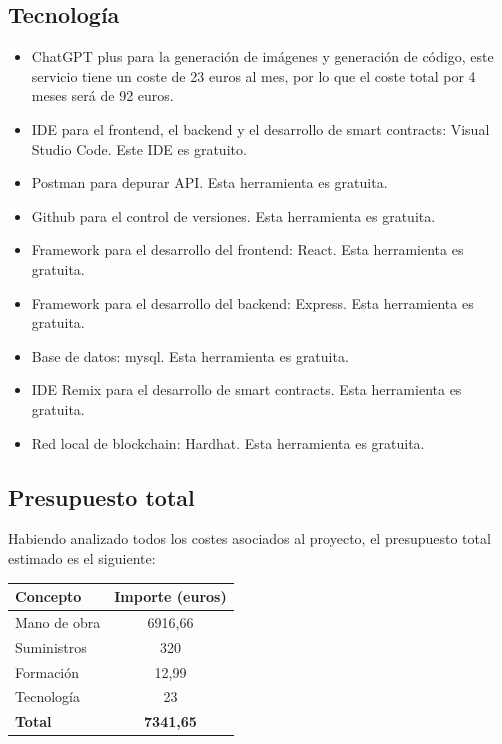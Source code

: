 \subsection{Tecnología}
\begin{itemize}
    \item ChatGPT plus para la generación de imágenes y generación de código, este servicio tiene un coste de 23 euros al mes, por lo que el coste total por 4 meses será de 92 euros.\\
    \item IDE para el frontend, el backend y el desarrollo de smart contracts: Visual Studio Code. Este IDE es gratuito.\\
    \item Postman para depurar API. Esta herramienta es gratuita.\\
    \item Github para el control de versiones. Esta herramienta es gratuita.\\
    \item Framework para el desarrollo del frontend: React. Esta herramienta es gratuita.\\
    \item Framework para el desarrollo del backend: Express. Esta herramienta es gratuita.\\
    \item Base de datos: mysql. Esta herramienta es gratuita.\\
    \item IDE Remix para el desarrollo de smart contracts. Esta herramienta es gratuita.\\
    \item Red local de blockchain: Hardhat. Esta herramienta es gratuita.\\
\end{itemize}

\subsection{Presupuesto total}
Habiendo analizado todos los costes asociados al proyecto, el presupuesto total estimado es el siguiente:
\begin{center}
\renewcommand{\arraystretch}{1.3}
\setlength{\tabcolsep}{8pt}
\begin{tabular}{|p{6cm}|c|}
\hline
\textbf{Concepto} & \textbf{Importe (euros)} \\ \hline
Mano de obra & 6916,66 \\ \hline
Suministros & 320 \\ \hline
Formación & 12,99 \\ \hline
Tecnología & 23 \\ \hline
\textbf{Total} & \textbf{7341,65} \\ \hline
\end{tabular}
\end{center}




